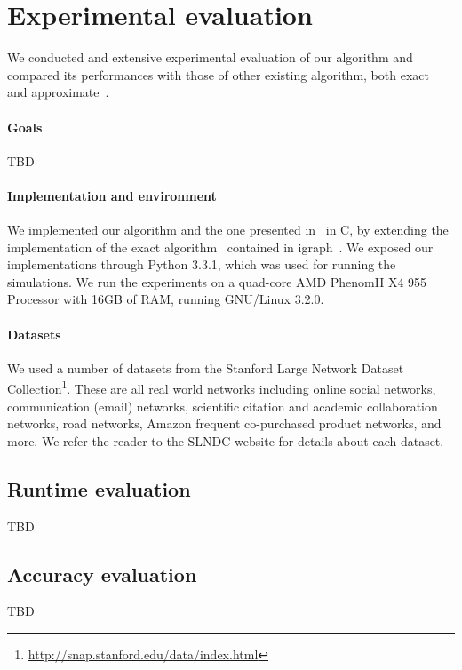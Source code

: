 \section{Experimental evaluation}\label{sec:exper}
We conducted and extensive experimental evaluation of our algorithm and
compared its performances with those of other existing algorithm, both
exact~\citep{Brandes01} and approximate~\citep{BrandesP08,JakobKLPT05}.

\paragraph{Goals} TBD

\paragraph{Implementation and environment}
We implemented our algorithm and the one presented
in~\citep{BrandesP08,JakobKLPT05} in C, by extending the implementation of the
exact algorithm~\citep{Brandes01} contained in igraph~\citep{igraph}. We
exposed our implementations through Python 3.3.1, which was used for running the
simulations. We run the experiments on a quad-core AMD Phenom\texttrademark II
X4 955 Processor with 16GB of RAM, running GNU/Linux 3.2.0.

\paragraph{Datasets} We used a number of datasets from the Stanford Large
Network Dataset
Collection\footnote{\url{http://snap.stanford.edu/data/index.html}}. These are
all real world networks including online social networks, communication (email)
networks, scientific citation and academic collaboration networks, road
networks, Amazon frequent co-purchased product networks, and more. We refer the
reader to the SLNDC website for details about each dataset.

\subsection{Runtime evaluation}\label{sec:runtime}
TBD

\subsection{Accuracy evaluation}\label{sec:accuracy}
TBD
